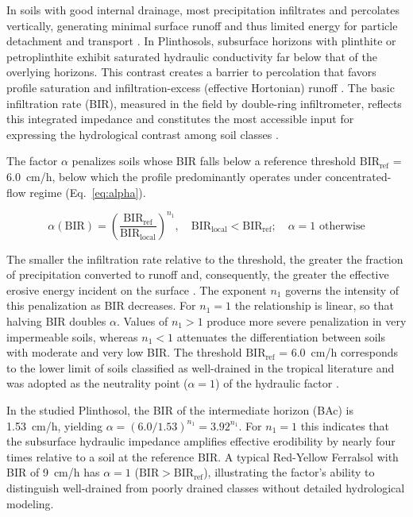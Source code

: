 \documentclass[pdflatex,sn-basic,referee,lineno]{sn-jnl}
\begin{document}
In soils with good internal drainage, most precipitation infiltrates and percolates vertically, generating minimal surface runoff and thus limited energy for particle detachment and transport \citep{deroo_1992}. In Plinthosols, subsurface horizons with plinthite or petroplinthite exhibit saturated hydraulic conductivity far below that of the overlying horizons. This contrast creates a barrier to percolation that favors profile saturation and infiltration-excess (effective Hortonian) runoff \citep{padmanabhan_2005}. The basic infiltration rate (BIR), measured in the field by double-ring infiltrometer, reflects this integrated impedance and constitutes the most accessible input for expressing the hydrological contrast among soil classes \citep{bertoni_lombardi_neto_2017}.

The factor $\alpha$ penalizes soils whose BIR falls below a reference threshold $\mathrm{BIR_{ref}}$ = 6.0~cm/h, below which the profile predominantly operates under concentrated-flow regime (Eq.~\ref{eq:alpha}).

\begin{equation}
\alpha(\mathrm{BIR}) = \left(\frac{\mathrm{BIR_{ref}}}{\mathrm{BIR_{local}}}\right)^{n_1}, \quad \mathrm{BIR_{local}} < \mathrm{BIR_{ref}}; \quad \alpha = 1 \text{ otherwise}
\label{eq:alpha}
\end{equation}

The smaller the infiltration rate relative to the threshold, the greater the fraction of precipitation converted to runoff and, consequently, the greater the effective erosive energy incident on the surface \citep{kinnell_2005}. The exponent $n_1$ governs the intensity of this penalization as BIR decreases. For $n_1 = 1$ the relationship is linear, so that halving BIR doubles $\alpha$. Values of $n_1 > 1$ produce more severe penalization in very impermeable soils, whereas $n_1 < 1$ attenuates the differentiation between soils with moderate and very low BIR. The threshold $\mathrm{BIR_{ref}}$ = 6.0~cm/h corresponds to the lower limit of soils classified as well-drained in the tropical literature and was adopted as the neutrality point ($\alpha = 1$) of the hydraulic factor \citep{embrapa_2018}.

In the studied Plinthosol, the BIR of the intermediate horizon (BAc) is 1.53~cm/h, yielding $\alpha = (6.0/1.53)^{n_1} = 3.92^{n_1}$. For $n_1 = 1$ this indicates that the subsurface hydraulic impedance amplifies effective erodibility by nearly four times relative to a soil at the reference BIR. A typical Red-Yellow Ferralsol with BIR of 9~cm/h has $\alpha = 1$ ($\mathrm{BIR} > \mathrm{BIR_{ref}}$), illustrating the factor's ability to distinguish well-drained from poorly drained classes without detailed hydrological modeling.
\end{document}
